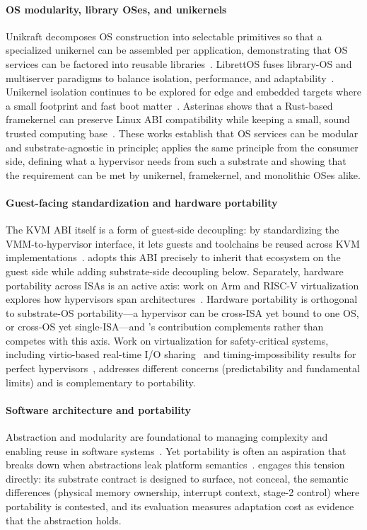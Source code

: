 \paragraph{OS modularity, library OSes, and unikernels}
Unikraft decomposes OS construction into selectable primitives so that a
specialized unikernel can be assembled per application, demonstrating that OS
services can be factored into reusable libraries~\cite{kuenzer2021unikraft}.
LibrettOS fuses library-OS and multiserver paradigms to balance isolation,
performance, and adaptability~\cite{nikolaev2020librettos}. Unikernel isolation
continues to be explored for edge and embedded targets where a small footprint
and fast boot matter~\cite{kaiser2024unikernels, ueda2024mewz}. Asterinas shows
that a Rust-based framekernel can preserve Linux ABI compatibility while keeping
a small, sound trusted computing base~\cite{peng2025asterinas,
peng2024framekernel}. These works establish that OS services can be modular and
substrate-agnostic in principle; \axvisor{} applies the same principle from the
consumer side, defining what a hypervisor needs from such a substrate and
showing that the requirement can be met by unikernel, framekernel, and
monolithic OSes alike.

\paragraph{Guest-facing standardization and hardware portability}
The KVM ABI itself is a form of guest-side decoupling: by standardizing the
VMM-to-hypervisor interface, it lets guests and toolchains be reused across KVM
implementations~\cite{kivity2007kvm}. \axvisor{} adopts this ABI precisely to
inherit that ecosystem on the guest side while adding substrate-side decoupling
below. Separately, hardware portability across ISAs is an active axis: work on
Arm and RISC-V virtualization explores how hypervisors span
architectures~\cite{sa2023cva6}. Hardware portability is orthogonal to
substrate-OS portability---a hypervisor can be cross-ISA yet bound to one OS, or
cross-OS yet single-ISA---and \axvisor{}'s contribution complements rather than
competes with this axis. Work on virtualization for safety-critical systems,
including virtio-based real-time I/O sharing~\cite{peixoto2024birtio} and
timing-impossibility results for perfect hypervisors~\cite{guri2025impossibility},
addresses different concerns (predictability and fundamental limits) and is
complementary to portability.

\paragraph{Software architecture and portability}
Abstraction and modularity are foundational to managing complexity and enabling
reuse in software systems~\cite{shaw2025abstractions, wan2023software}. Yet
portability is often an aspiration that breaks down when abstractions leak
platform semantics~\cite{mince2023illusion}. \axvisor{} engages this tension
directly: its substrate contract is designed to surface, not conceal, the
semantic differences (physical memory ownership, interrupt context, stage-2
control) where portability is contested, and its evaluation measures adaptation
cost as evidence that the abstraction holds.
